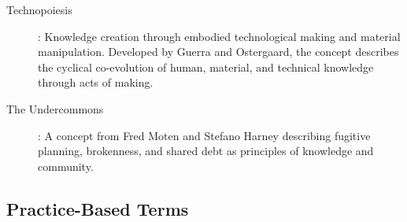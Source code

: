\begin{description}
	\item[Technopoiesis]: Knowledge creation through embodied technological making and material manipulation. Developed by Guerra and Ostergaard, the concept describes the cyclical co-evolution of human, material, and technical knowledge through acts of making.
	
	\item[The Undercommons]: A concept from Fred Moten and Stefano Harney describing fugitive planning, brokenness, and shared debt as principles of knowledge and community.
\end{description}

\subsection*{Practice-Based Terms}

